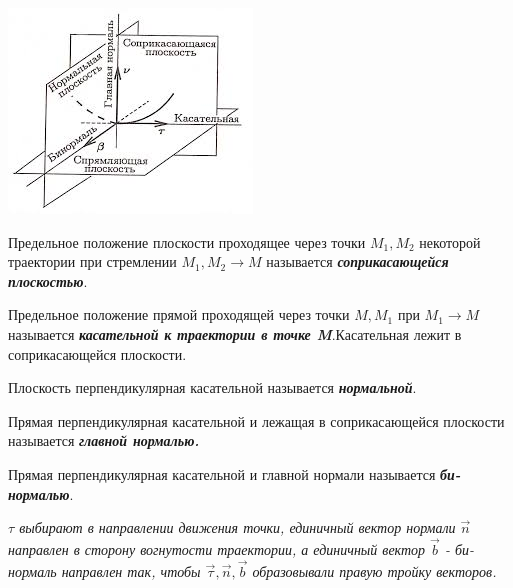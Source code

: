 \begin{enumerate}
\begin{enumerate}
\begin{center}
                        \includegraphics[]{img/images.jpeg}
                    \end{center}
                    \vspace{5px}

                     Предельное положение плоскости проходящее через точки $M_1,M_2$ некоторой траектории при стремлении $M_1,M_2 \to M$ называется \textbf{\textit{соприкасающейся плоскостью}}.

                    \vspace{5px}

                     Предельное положение прямой проходящей через точки $M,M_1$ при $M_1 \to M$ называется \textbf{\textit{касательной к траектории в точке M}}.Касательная лежит в соприкасающейся плоскости.

                    \vspace{5px}

                     Плоскость перпендикулярная касательной называется \textbf{\textit{нормальной}}.

                    \vspace{5px}

                     Прямая перпендикулярная касательной и лежащая в соприкасающейся плоскости называется \textbf{\textit{главной нормалью.}}

                    \vspace{5px}

                     Прямая перпендикулярная касательной и главной нормали называется \textbf{\textit{би-нормалью}}.

                    \vspace{5px}

                    \textit{$\tau$ выбирают в направлении движения точки, единичный вектор нормали $\vec n$ направлен в сторону вогнутости траектории, а единичный вектор $\vec b$ - би-нормаль направлен так, чтобы $\vec \tau, \vec n, \vec b$ образовывали правую тройку векторов.}


\end{enumerate}
\end{enumerate}
